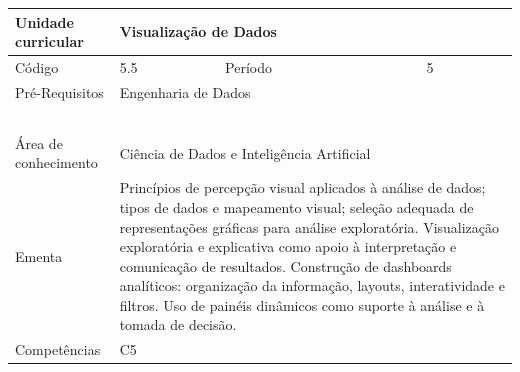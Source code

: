 \begin{quadro}[ht!]
\begin{tabular}{|p{2.5cm}|p{2.5cm}|p{2.5cm}|p{2.5cm}|p{2.5cm}|}
  
	\end{tabular}

\end{quadro}


\clearpage
\newpage

\begin{quadro}[ht!]
  \centering\scriptsize
\caption{Unidade Curricular Visualização de Dados}

\begin{tabular}{|p{2.5cm}|p{2.5cm}|p{2.5cm}|p{2.5cm}|p{2.5cm}|}\hline

  Unidade curricular & \multicolumn{4}{p{10cm}|}{ Visualização de Dados }\\\hline
  Código & 5.5 & Período & \multicolumn{2}{p{5cm}|}{ 5 }\\\hline
  Pré-Requisitos & \multicolumn{4}{p{10cm}|}{ Engenharia de Dados } \\\hline
  \cellcolor{blue1}{ CH PRESENCIAL } &
    \cellcolor{blue1}{CH EAD Síncrona} &
    \cellcolor{blue1}{CH EAD Síncrona Mediada} &
    \cellcolor{blue1}{CH EAD Assíncrona} &
    \cellcolor{blue1}{CH APCC} \\\hline
  \cellcolor{blue1}{ 60 } &
    \cellcolor{blue1}{ 0 } &
    \cellcolor{blue1}{ 0 } &
    \cellcolor{blue1}{ 0 } &
    \cellcolor{blue1}{0} \\\hline
  \cellcolor{blue1}{ CH Teórica } &
    \cellcolor{blue1}{CH Prática} &
    \cellcolor{blue1}{CH Humanidades} &
    \cellcolor{blue1}{CH Extensão} &
    \cellcolor{blue1}{CH EAD TOTAL} \\\hline
  \cellcolor{blue1}{ 30 } &
    \cellcolor{blue1}{ 30 } &
    \cellcolor{blue1}{ 0 } &
    \cellcolor{blue1}{ 0 } &
    \cellcolor{blue1}{ 0 } \\\hline
  \cellcolor{blue1}{CARGA-HORÁRIA TOTAL} & \multicolumn{4}{p{10cm}|}{ \cellcolor{blue1}{ 60 } } \\\hline
  Área de conhecimento & \multicolumn{4}{p{10cm}|}{ Ciência de Dados e Inteligência Artificial } \\\hline
  Ementa & \multicolumn{4}{p{10cm}|}{ Princípios de percepção visual aplicados à análise de dados; tipos de dados e mapeamento visual; seleção adequada de representações gráficas para análise exploratória. Visualização exploratória e explicativa como apoio à interpretação e comunicação de resultados. Construção de dashboards analíticos: organização da informação, layouts, interatividade e filtros. Uso de painéis dinâmicos como suporte à análise e à tomada de decisão. } \\\hline
  Competências & \multicolumn{4}{p{10cm}|}{ C5 } \\\hline


  
	\end{tabular}

\end{quadro}


